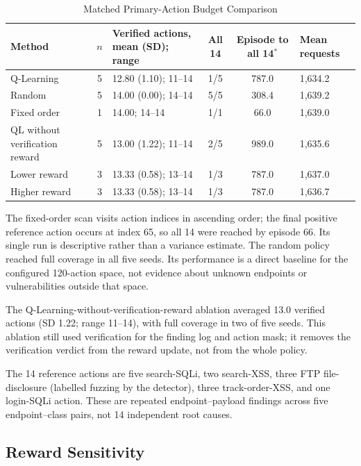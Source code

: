 \documentclass[conference, a4paper]{IEEEtran}
\begin{document}
\begin{table}[!t]
\caption{Matched Primary-Action Budget Comparison}
\label{tab:strategy-results}
\centering
\scriptsize
\begin{tabular}{p{}c p{}c c p{}}
\toprule
\textbf{Method} & \textbf{$n$} & \textbf{Verified actions, mean (SD); range} & \textbf{All 14} & \textbf{Episode to all 14$^*$} & \textbf{Mean requests}\\
\midrule
Q-Learning & 5 & 12.80 (1.10); 11--14 & 1/5 & 787.0 & 1,634.2\\
Random & 5 & 14.00 (0.00); 14--14 & 5/5 & 308.4 & 1,639.2\\
Fixed order & 1 & 14.00; 14--14 & 1/1 & 66.0 & 1,639.0\\
QL without verification reward & 5 & 13.00 (1.22); 11--14 & 2/5 & 989.0 & 1,635.6\\
Lower reward & 3 & 13.33 (0.58); 13--14 & 1/3 & 787.0 & 1,637.0\\
Higher reward & 3 & 13.33 (0.58); 13--14 & 1/3 & 787.0 & 1,636.7\\
\bottomrule
\end{tabular}
\end{table}

The fixed-order scan visits action indices in ascending order;
the final positive reference action occurs at index 65, so all 14
were reached by episode 66. Its single run is descriptive rather
than a variance estimate. The random policy reached full coverage
in all five seeds. Its performance is a direct baseline for the
configured 120-action space, not evidence about unknown endpoints
or vulnerabilities outside that space.

The Q-Learning-without-verification-reward ablation averaged
13.0 verified actions (SD 1.22; range 11--14), with full coverage
in two of five seeds. This ablation still used verification for
the finding log and action mask; it removes the verification
verdict from the reward update, not from the whole policy.

The 14 reference actions are five search-SQLi, two search-XSS,
three FTP file-disclosure (labelled fuzzing by the detector),
three track-order-XSS, and one login-SQLi action. These are
repeated endpoint--payload findings across five endpoint--class
pairs, not 14 independent root causes.
\subsection{Reward Sensitivity}
\label{sec:reward-sensitivity}
\end{document}
